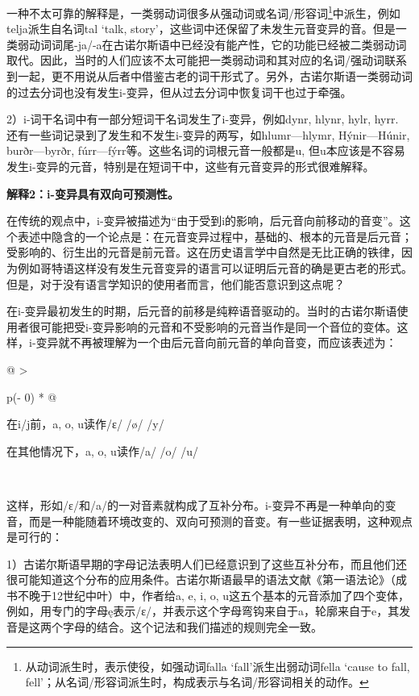{{一种不太可靠的解释是，一类弱动词很多从强动词或名词/形容词\footnote{从动词派生时，表示使役，如强动词falla
  `fall'派生出弱动词fella `cause to fall,
  fell'；从名词/形容词派生时，构成表示与名词/形容词相关的动作。}中派生，例如telja派生自名词tal
`talk,
story'，这些词中还保留了未发生元音变异的音。但是一类弱动词词尾-ja/-a在古诺尔斯语中已经没有能产性，它的功能已经被二类弱动词取代。因此，当时的人们应该不太可能把一类弱动词和其对应的名词/强动词联系到一起，更不用说从后者中借鉴古老的词干形式了。另外，古诺尔斯语一类弱动词的过去分词也没有发生i-变异，但从过去分词中恢复词干也过于牵强。

2）i-词干名词中有一部分短词干名词发生了i-变异，例如dynr, hlynr, hylr,
hyrr. 还有一些词记录到了发生和不发生i-变异的两写，如hlumr---hlymr,
Hýnir---Húnir, burðr---byrðr,
fúrr---fýrr等。这些名词的词根元音一般都是u,
但u本应该是不容易发生i-变异的元音，特别是在短词干中，这些有元音变异的形式很难解释。

\textbf{解释2：i-变异具有双向可预测性。}

在传统的观点中，i-变异被描述为``由于受到i的影响，后元音向前移动的音变''。这个表述中隐含的一个论点是：在元音变异过程中，基础的、根本的元音是后元音；受影响的、衍生出的元音是前元音。这在历史语言学中自然是无比正确的铁律，因为例如哥特语这样没有发生元音变异的语言可以证明后元音的确是更古老的形式。但是，对于没有语言学知识的使用者而言，他们能否意识到这点呢？

在i-变异最初发生的时期，后元音的前移是纯粹语音驱动的。当时的古诺尔斯语使用者很可能把受i-变异影响的元音和不受影响的元音当作是同一个音位的变体。这样，i-变异就不再被理解为一个由后元音向前元音的单向音变，而应该表述为：

\begin{longtable}[]{@{}
  >{\raggedright\arraybackslash}p{(\columnwidth - 0\tabcolsep) * }@{}}
  \toprule\noalign{}
  \begin{minipage}[b]{\linewidth}\raggedright
    在i/j前，a, o, u读作/ɛ/ /ø/ /y/

    在其他情况下，a, o, u读作/a/ /o/ /u/
  \end{minipage} \\
  \midrule\noalign{}
  \endhead
  \bottomrule\noalign{}
  \endlastfoot
\end{longtable}

这样，形如/ɛ/和/a/的一对音素就构成了互补分布。i-变异不再是一种单向的变音，而是一种能随着环境改变的、双向可预测的音变。有一些证据表明，这种观点是可行的：

1）古诺尔斯语早期的字母记法表明人们已经意识到了这些互补分布，而且他们还很可能知道这个分布的应用条件。古诺尔斯语最早的语法文献《第一语法论》（成书不晚于12世纪中叶）中，作者给a,
e, i, o,
u这五个基本的元音添加了四个变体，例如，用专门的字母ę表示/ɛ/，并表示这个字母弯钩来自于a，轮廓来自于e，其发音是这两个字母的结合。这个记法和我们描述的规则完全一致。

}}
